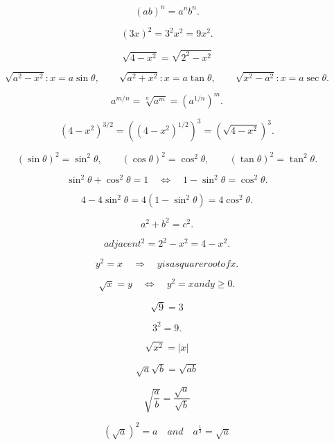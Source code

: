 \documentclass{article}
\begin{document}
\[
(ab)^n = a^n b^n.
\]

\[
(3x)^2=3^2x^2=9x^2.
\]

\[
\sqrt{4-x^2}=\sqrt{2^2-x^2}
\]

\[
\sqrt{a^2-x^2}: x=a\sin\theta,\qquad
 \sqrt{a^2+x^2}: x=a\tan\theta,\qquad
 \sqrt{x^2-a^2}: x=a\sec\theta.
\]

\[
a^{m/n}=\sqrt[n]{a^m}=\left(a^{1/n}\right)^m.
\]

\[
(4-x^2)^{3/2}=\left((4-x^2)^{1/2}\right)^3=\left(\sqrt{4-x^2}\right)^3.
\]

\[
(\sin\theta)^2=\sin^2\theta,\qquad
 (\cos\theta)^2=\cos^2\theta,\qquad
 (\tan\theta)^2=\tan^2\theta.
\]

\[
\sin^2\theta+\cos^2\theta=1
 \quad\Longleftrightarrow\quad
 1-\sin^2\theta=\cos^2\theta.
\]

\[
4-4\sin^2\theta=4(1-\sin^2\theta)=4\cos^2\theta.
\]

\[
a^2+b^2=c^2.
\]

\[
adjacent ^2=2^2-x^2=4-x^2.
\]

\[
y^2=x
 \quad\Longrightarrow\quad
 y is a square root of x.
\]

\[
\sqrt{x}=y
 \quad\Longleftrightarrow\quad
 y^2=x and y\ge 0.
\]

\[
\sqrt{9}=3
\]

\[
3^2=9.
\]

\[
\sqrt{x^2}=|x|
\]

\[
\sqrt{a}\sqrt{b}=\sqrt{ab}
\]

\[
\sqrt{\frac{a}{b}}=\frac{\sqrt{a}}{\sqrt{b}}
\]

\[
\left(\sqrt{a}\right)^2=a
 \quad and \quad
 a^\frac{1}{2}=\sqrt{a}
\]
\end{document}
